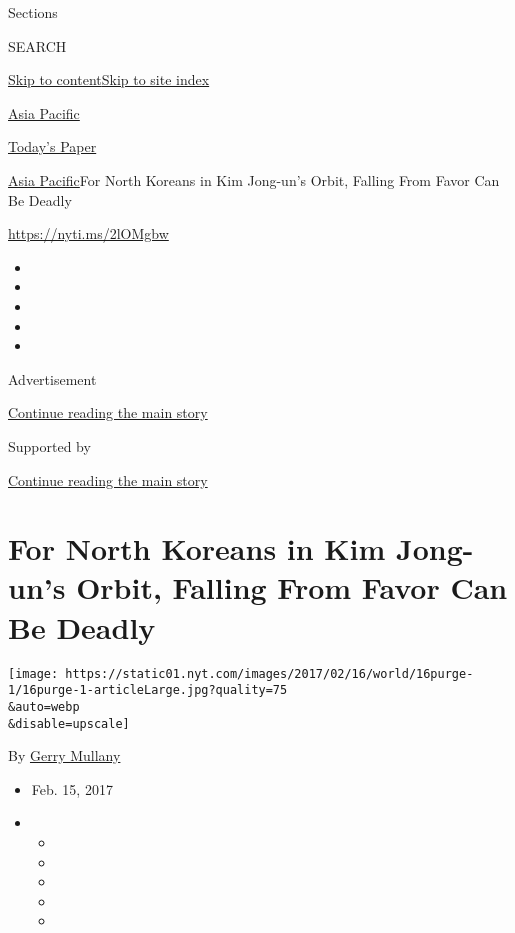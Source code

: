Sections

SEARCH

\protect\hyperlink{site-content}{Skip to
content}\protect\hyperlink{site-index}{Skip to site index}

\href{https://www.nytimes.com/section/world/asia}{Asia Pacific}

\href{https://myaccount.nytimes.com/auth/login?response_type=cookie\&client_id=vi}{}

\href{https://www.nytimes.com/section/todayspaper}{Today's Paper}

\href{/section/world/asia}{Asia Pacific}\textbar{}For North Koreans in
Kim Jong-un's Orbit, Falling From Favor Can Be Deadly

\url{https://nyti.ms/2lOMgbw}

\begin{itemize}
\item
\item
\item
\item
\item
\end{itemize}

Advertisement

\protect\hyperlink{after-top}{Continue reading the main story}

Supported by

\protect\hyperlink{after-sponsor}{Continue reading the main story}

\hypertarget{for-north-koreans-in-kim-jong-uns-orbit-falling-from-favor-can-be-deadly}{%
\section{For North Koreans in Kim Jong-un's Orbit, Falling From Favor
Can Be
Deadly}\label{for-north-koreans-in-kim-jong-uns-orbit-falling-from-favor-can-be-deadly}}

\texttt{[image: https://static01.nyt.com/images/2017/02/16/world/16purge-1/16purge-1-articleLarge.jpg?quality=75\\\&auto=webp\\\&disable=upscale]}

By \href{http://www.nytimes.com/by/gerry-mullany}{Gerry Mullany}

\begin{itemize}
\item
  Feb. 15, 2017
\item
  \begin{itemize}
  \item
  \item
  \item
  \item
  \item
  \end{itemize}
\end{itemize}


